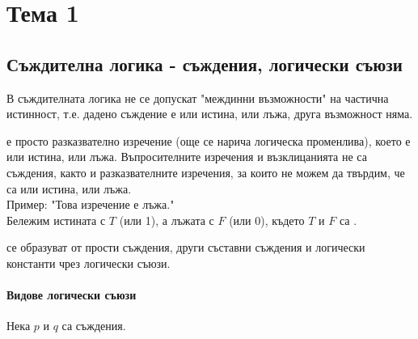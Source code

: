 \section{Тема 1}

\subsection{Съждителна логика - съждения, логически съюзи}

В съждителната логика не се допускат "междинни възможности" на частична истинност, т.е. дадено съждение
е или истина, или лъжа, друга възможност няма.

 е просто разказвателно изречение (още се нарича логическа променлива), 
което е или истина, или лъжа. Въпросителните изречения и възклицанията не са съждения, както и разказвателните
изречения, за които не можем да твърдим, че са или истина, или лъжа.\\
Пример: "Това изречение е лъжа."\\
Бележим истината с \(T\) (или 1), а лъжата с \(F\) (или 0), където \(T\) и \(F\) са 
.

 се образуват от прости съждения, други съставни съждения и логически константи чрез
логически съюзи.

\paragraph{Видове логически съюзи\\}

Нека \(p\) и \(q\) са съждения.

